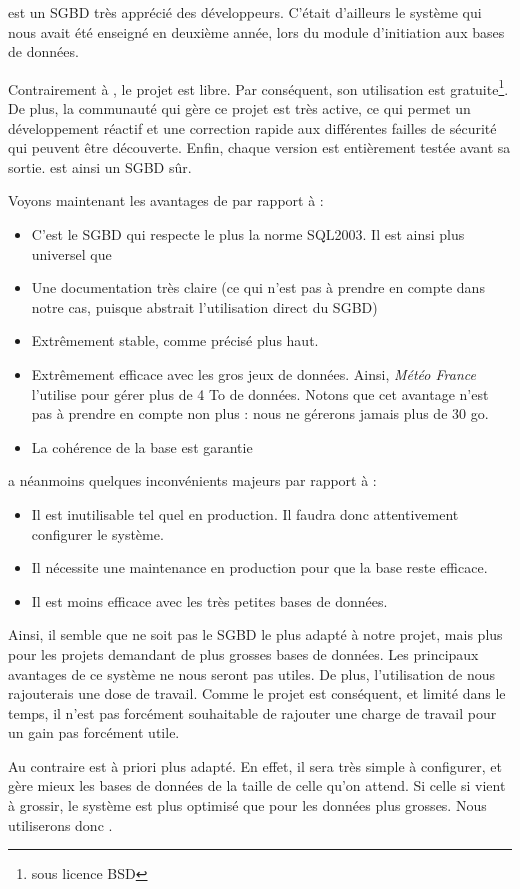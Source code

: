 \psql est un SGBD très apprécié des développeurs. C'était d'ailleurs le système qui nous avait été enseigné en deuxième année, lors du module d'initiation aux bases de données. 

Contrairement à \mysql, le projet est libre. Par conséquent, son utilisation est gratuite\footnote{sous licence BSD}. De plus, la communauté qui gère ce projet est très active, ce qui permet un développement réactif et une correction rapide aux différentes failles de sécurité qui peuvent être découverte. 
Enfin, chaque version est entièrement testée avant sa sortie. \psql est ainsi un SGBD sûr. 

Voyons maintenant les avantages de \psql par rapport à \mdb : 

\begin{itemize}
\item C'est le SGBD qui respecte le plus la norme SQL2003. Il est ainsi plus universel que \mdb
\item Une documentation très claire (ce qui n'est pas à prendre en compte dans notre cas, puisque \symfony abstrait l'utilisation direct du SGBD)
\item Extrêmement stable, comme précisé plus haut. 
\item Extrêmement efficace avec les gros jeux de données. Ainsi, \textit{Météo France} l'utilise pour gérer plus de 4 To de données. Notons que cet avantage n'est pas à prendre en compte non plus : nous ne gérerons jamais plus de 30 go. 
\item La cohérence de la base est garantie
\end{itemize}

\psql a néanmoins quelques inconvénients majeurs  par rapport à \mdb : 

\begin{itemize}
\item Il est inutilisable tel quel en production. Il faudra donc attentivement configurer le système. 
\item Il nécessite une maintenance en production pour que la base reste efficace. 
\item Il est moins efficace avec les très petites bases de données.  
\end{itemize}

\bigbreak
Ainsi, il semble que \psql ne soit pas le SGBD le plus adapté à notre projet, mais plus pour les projets demandant de plus grosses bases de données. 
Les principaux avantages de ce système ne nous seront pas utiles. De plus, l'utilisation de \psql nous rajouterais une dose de travail. Comme le projet est conséquent, et limité dans le temps, il n'est pas forcément souhaitable de rajouter une charge de travail pour un gain pas forcément utile. 

Au contraire \mdb est à priori plus adapté. En effet, il sera très simple à configurer, et gère mieux les bases de données de la taille de celle qu'on attend. Si celle si vient à grossir, le système est plus optimisé que \mysql pour les données plus grosses. Nous utiliserons donc \mdb. 
